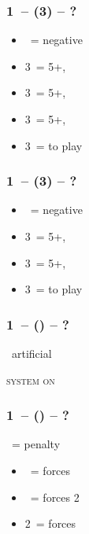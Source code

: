 \documentclass[12pt, a4paper]{report}
\begin{document}
{{{            \subsubsection*{1\ntx\ -- (3\clubs) -- ?}
            \begin{itemize}
                \item \dbl\ = negative
                \item 3\diams\ = 5+\hearts, \invp
                \item 3\hearts\ = 5+\spades, \invp
                \item 3\spades\ = 5+\diams, \invp
                \item 3\nt\ = to play
            \end{itemize}

            \subsubsection*{1\ntx\ -- (3\diams) -- ?}
            \begin{itemize}
                \item \dbl\ = negative
                \item 3\hearts\ = 5+\spades, \invp
                \item 3\spades\ = 5+\hearts, \gf
                \item 3\nt\ = to play
            \end{itemize}

            \subsubsection*{1\ntx\ -- (\alrts{\dbl}) -- ?}
            \dbl\ artificial

            \textsc{system on}

            \subsubsection*{1\ntx\ -- (\dbl) -- ?}
            \dbl\ = penalty
            \begin{itemize}
                \item \pass\ = forces \rdbl
                \item \rdbl\ = forces 2\clubs
                \item 2\ = forces 
            \end{itemize}

}}}
\end{document}
